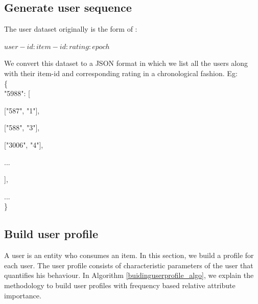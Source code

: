 \documentclass[11pt]{article}
\begin{document}
\subsection{Generate user sequence}
\normalfont
The user dataset originally is the form of :
\begin{center}
$user-id : item-id : rating : epoch$ 
\end{center}

We convert this dataset to a JSON format in which we list all the users along with their item-id and corresponding rating in a chronological fashion.
Eg:\\
\{ \\
  "5988": [ 
  
\hspace{15 mm} ["587", "1"],

\hspace{15 mm} ["588", "3"],

\hspace{15 mm} ["3006", "4"],

\hspace{15 mm} ...

\hspace{8 mm} ],

...\\
\}

\normalmarginpar
\subsection{Build user profile}
A user is an entity who consumes an item. In this section,
we build a profile for each user. The user profile consists
of characteristic parameters of the user that quantifies his behaviour. In Algorithm \ref{buidinguserprofile_algo}, we explain the methodology to build user profiles with frequency based relative attribute importance.
 
\end{document}
